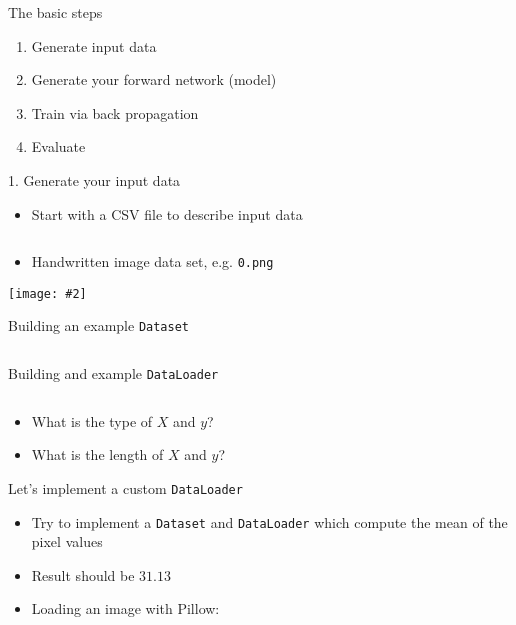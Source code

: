 \documentclass[hyperref={pdfpagelabels=false},12pt]{beamer}
\newcommand{\ig}[2]{\texttt{[image: \#2]}}
\newcommand{\code}[2]{\texttt{#2}}
\newcommand{\python}[1]{\code{python}{#1}}
\newcommand{\pygment}[3]{\inputminted[bgcolor=lightgray,linenos,fontsize=#1]{#2}{#3}}
\newcommand{\pygmentLines}[5]{\inputminted[bgcolor=lightgray,linenos,fontsize=#1,firstline=#2,lastline=#3,autogobble]{#4}{#5}}
\begin{document}
\begin{frame}{The basic steps}
  \begin{enumerate}
      \item Generate input data
      \item Generate your forward network (model)
      \item Train via back propagation
      \item Evaluate
  \end{enumerate}
\end{frame}

\begin{frame}{1. Generate your input data}
  \begin{itemize}
    \item Start with a CSV file to describe input data
  \end{itemize}
  \pygmentLines{\scriptsize}{1}{5}{text}{data/mnist.csv}
  \begin{itemize}
    \item Handwritten image data set, e.g. \texttt{0.png}
  \end{itemize}
  \begin{center}
    \ig{0.25}{figures/0.png}
  \end{center}
\end{frame}

\begin{frame}{Building an example \python{Dataset}}
  \pygment{\scriptsize}{python}{code/basic-dataset.py}
\end{frame}

\begin{frame}{Building and example \python{DataLoader}}
  \pygment{\scriptsize}{python}{code/basic-dataloader.py}
  \vspace{-0.5cm}
  \begin{itemize}
    \item What is the type of $X$ and $y$?
    \item What is the length of $X$ and $y$?
  \end{itemize}
\end{frame}

\begin{frame}{Let's implement a custom \python{DataLoader}}
  \begin{itemize}
    \item Try to implement a \python{Dataset} and \python{DataLoader} which
      compute the mean of the pixel values
    \item Result should be $31.13$
    \item Loading an image with Pillow:
  \end{itemize}
  \pygment{\scriptsize}{python}{code/pil-open.py}
\end{frame}
\end{document}
